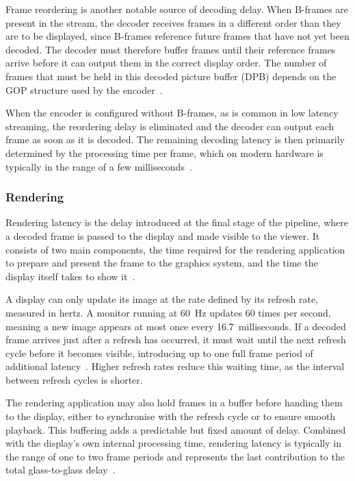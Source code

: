 Frame reordering is another notable source of decoding delay. When B-frames are present in the stream, the decoder receives frames in a different order than they are to be displayed, since B-frames reference future frames that have not yet been decoded. The decoder must therefore buffer frames until their reference frames arrive before it can output them in the correct display order. The number of frames that must be held in this decoded picture buffer (DPB) depends on the GOP structure used by the encoder~\cite{hamidouche2022}.
 
When the encoder is configured without B-frames, as is common in low latency streaming, the reordering delay is eliminated and the decoder can output each frame as soon as it is decoded. The remaining decoding latency is then primarily determined by the processing time per frame, which on modern hardware is typically in the range of a few milliseconds~\cite{axis2024}.

\subsubsection{Rendering}\label{subsec:rendering}
Rendering latency is the delay introduced at the final stage of the pipeline, where a decoded frame is passed to the display and made visible to the viewer. It consists of two main components, the time required for the rendering application to prepare and present the frame to the graphics system, and the time the display itself takes to show it~\cite{axis2024}.
 
A display can only update its image at the rate defined by its refresh rate, measured in hertz. A monitor running at 60~Hz updates 60 times per second, meaning a new image appears at most once every 16.7~milliseconds. If a decoded frame arrives just after a refresh has occurred, it must wait until the next refresh cycle before it becomes visible, introducing up to one full frame period of additional latency~\cite{leray2018}. Higher refresh rates reduce this waiting time, as the interval between refresh cycles is shorter.
 
The rendering application may also hold frames in a buffer before handing them to the display, either to synchronise with the refresh cycle or to ensure smooth playback. This buffering adds a predictable but fixed amount of delay. Combined with the display's own internal processing time, rendering latency is typically in the range of one to two frame periods and represents the last contribution to the total glass-to-glass delay~\cite{axis2024}.

